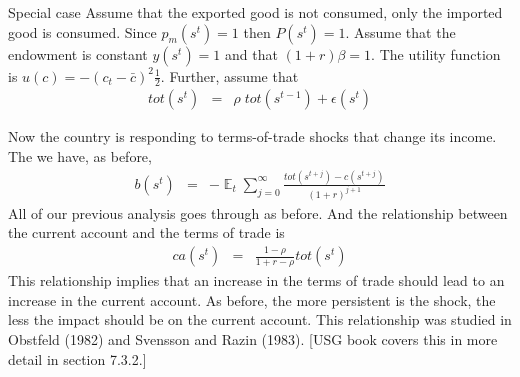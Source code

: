 \documentclass[11pt,pdftex,twoside,letterpaper]{exam}
\DeclareMathOperator{\EX}{\mathbb{E}}%
\begin{document}
\begin{mybox}{Special case}
Assume that the exported good is not consumed, only the imported good is consumed. Since $p_m(s^t)=1$ then $P(s^t)=1$.  Assume that the endowment is constant $y(s^t)=1$ and that $(1+r)\beta=1$. The utility function is $u(c)=-(c_t-\bar{c})^2\frac{1}{2}$. Further, assume that
\begin{eqnarray}
  tot(s^t) &=& \rho \; tot(s^{t-1}) + \epsilon(s^t)
\end{eqnarray}

Now the country is responding to terms-of-trade shocks that change its income. The we have, as before,
\begin{eqnarray}
  b(s^t) &=& -\EX_t \sum_{j=0}^\infty\frac{tot(s^{t+j})-c(s^{t+j})}{(1+r)^{j+1}}
\end{eqnarray}
All of our previous analysis goes through as before. And the relationship between the current account and the terms of trade is
\begin{eqnarray}
  ca(s^t) &=&   \frac{1-\rho}{1+r-\rho} tot(s^{t})
\end{eqnarray}
This relationship implies that an increase in the terms of trade should lead to an increase in the current account. As before, the more persistent is the shock, the less the impact should be on the current account. This relationship was studied in Obstfeld (1982) and Svensson and Razin (1983). [USG book covers this in more detail in section 7.3.2.]
\end{mybox}
\end{document}
